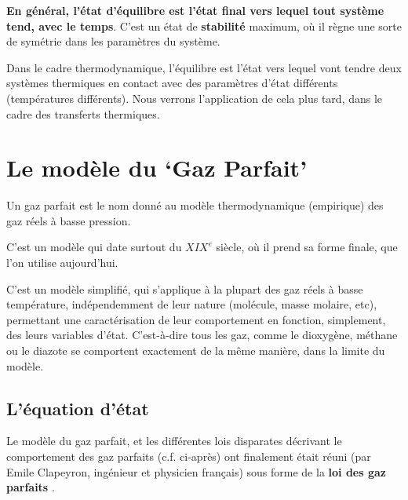 \documentclass[11pt,a4paper]{article}
\begin{document}
\textbf{En général, l'état d'équilibre est l'état final vers lequel tout système tend, avec le temps}. C'est un état de \textbf{stabilité} maximum, où il règne une sorte de symétrie dans les paramètres du système. 

Dans le cadre thermodynamique, l'équilibre est l'état vers lequel vont tendre deux systèmes thermiques en contact avec des paramètres d'état différents (températures différents). Nous verrons l'application de cela plus tard, dans le cadre des transferts thermiques. 

\section{Le modèle du `Gaz Parfait'}

Un gaz parfait  est le nom donné au modèle thermodynamique (empirique) des gaz réels à basse pression. 

C'est un modèle qui date surtout du $XIX^e$ siècle, où il prend sa forme finale, que l'on utilise aujourd'hui. 

C'est un modèle simplifié, qui s'applique à la plupart des gaz réels à basse température, indépendemment de leur nature (molécule, masse molaire, etc), permettant une caractérisation de leur comportement en fonction, simplement, des leurs variables d'état. C'est-à-dire tous les gaz, comme le dioxygène, méthane ou le diazote se comportent exactement de la même manière, dans la limite du modèle. 

\subsection{L'équation d'état}

Le modèle du gaz parfait, et les différentes lois disparates décrivant le comportement des gaz parfaits (c.f. ci-après) ont finalement était réuni (par Emile Clapeyron, ingénieur et physicien français) sous forme de la \textbf{loi des gaz parfaits} . 
\end{document}
